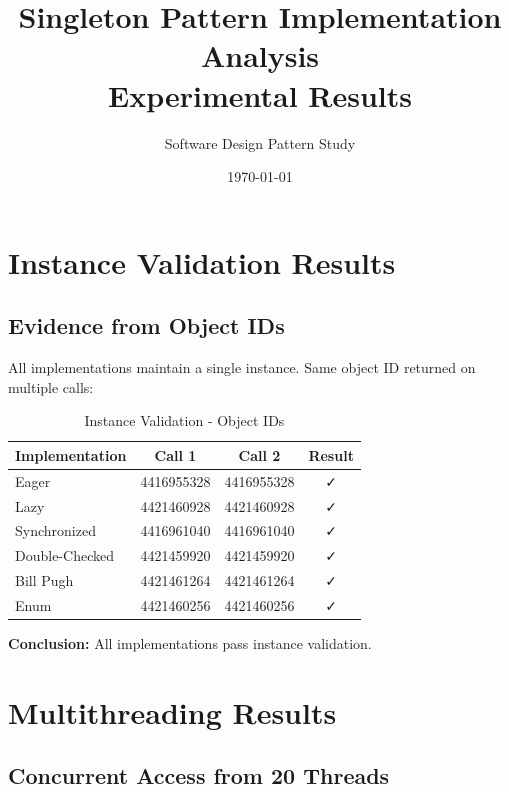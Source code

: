 \documentclass[12pt,a4paper]{article}
\title{
    \textbf{Singleton Pattern Implementation Analysis}\\
    \large Experimental Results
}
\author{Software Design Pattern Study}
\date{\today}
\begin{document}
\maketitle

\section{Instance Validation Results}

\subsection{Evidence from Object IDs}

All implementations maintain a single instance. Same object ID returned on multiple calls:

\begin{table}[H]
\centering
\caption{Instance Validation - Object IDs}
\label{tab:instance}
\begin{tabular}{|l|c|c|c|}
\hline
\textbf{Implementation} & \textbf{Call 1} & \textbf{Call 2} & \textbf{Result} \\
\hline\hline
Eager & 4416955328 & 4416955328 & \cellcolor{passgreen}✓ \\
Lazy & 4421460928 & 4421460928 & \cellcolor{passgreen}✓ \\
Synchronized & 4416961040 & 4416961040 & \cellcolor{passgreen}✓ \\
Double-Checked & 4421459920 & 4421459920 & \cellcolor{passgreen}✓ \\
Bill Pugh & 4421461264 & 4421461264 & \cellcolor{passgreen}✓ \\
Enum & 4421460256 & 4421460256 & \cellcolor{passgreen}✓ \\
\hline
\end{tabular}
\end{table}

\textbf{Conclusion:} All implementations pass instance validation.

\section{Multithreading Results}

\subsection{Concurrent Access from 20 Threads}
\end{document}
